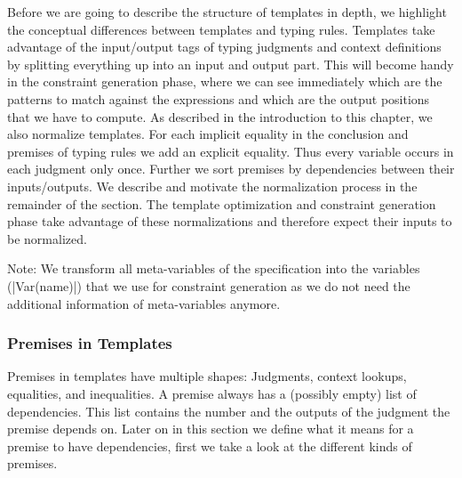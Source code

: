 Before we are going to describe the structure of templates in depth,
we highlight the conceptual differences between templates and typing
rules. Templates take advantage of the input/output tags of typing
judgments and context definitions by splitting everything up into an
input and output part. This will become handy in the constraint
generation phase, where we can see immediately which are the patterns
to match against the expressions and which are the output positions
that we have to compute. As described in the introduction to this
chapter, we also normalize templates. For each implicit equality in
the conclusion and premises of typing rules we add an explicit
equality. Thus every variable occurs in each judgment only
once. Further we sort premises by dependencies between their
inputs/outputs. We describe and motivate the normalization process in
the remainder of the section. The template optimization and constraint
generation phase take advantage of these normalizations and therefore
expect their inputs to be normalized.

Note: We transform all meta-variables of the specification into the
variables (\code|Var(name)|) that we use for constraint generation as
we do not need the additional information of meta-variables anymore.

\subsubsection{Premises in Templates}
Premises in templates have multiple shapes: Judgments, context
lookups, equalities, and inequalities. A premise always has a (possibly
empty) list of dependencies. This list contains the number and the
outputs of the judgment the premise depends on. Later on in this
section we define what it means for a premise to have dependencies,
first we take a look at the different kinds of premises.

